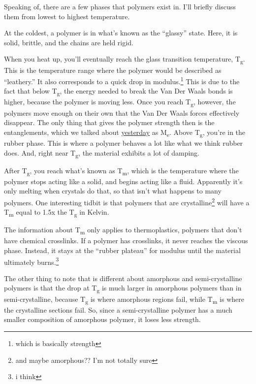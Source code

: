 \documentclass[12pt]{article}[titlepage]
\newcommand{\say}[1]{``#1''}
\newcommand{\1}{\={a}}
\newcommand{\2}{\={e}}
\newcommand{\3}{\={\i}}
\newcommand{\4}{\=o}
\newcommand{\5}{\=u}
\newcommand{\6}{\={A}}
\newcommand{\sub}[1]{\textsubscript{#1}}
\renewcommand{\,}{\textsuperscript{,}}
\begin{document}
Speaking of, there are a few phases that polymers exist in.
I'll briefly discuss them from lowest to highest temperature.

At the coldest, a polymer is in what's known as the \say{glassy} state.
Here, it is solid, brittle, and the chains are held rigid.

When you heat up, you'll eventually reach the glass transition temperature, T\sub{g}.
This is the temperature range where the polymer would be described as \say{leathery.}
It also corresponds to a quick drop in modulus.\footnote{which is basically strength}
This is due to the fact that below T\sub{g}, the energy needed to break the Van Der Waals bonds is higher, because the polymer is moving less.
Once you reach T\sub{g}, however, the polymers move enough on their own that the Van Der Waals forces effectively disappear.
The only thing that gives the polymer strength then is the entanglements, which we talked about \href{polymer-1.html}{yesterday} as M\sub{e}.
Above T\sub{g}, you're in the rubber phase.
This is where a polymer behaves a lot like what we think rubber does.
And, right near T\sub{g}, the material exhibits a lot of damping.

After T\sub{g}, you reach what's known as T\sub{m}, which is the temperature where the polymer stops acting like a solid, and begins acting like a fluid.
Apparently it's only melting when crystals do that, so that isn't what happens to many polymers.
One interesting tidbit is that polymers that are crystalline\footnote{and maybe amorphous?? I'm not totally sure} will have a T\sub{m} equal to 1.5x the T\sub{g} in Kelvin.

The information about T\sub{m} only applies to thermoplastics, polymers that don't have chemical crosslinks.
If a polymer has crosslinks, it never reaches the viscous phase.
Instead, it stays at the \say{rubber plateau} for modulus until the material ultimately burns.\footnote{i think}

The other thing to note that is different about amorphous and semi-crystalline polymers is that the drop at T\sub{g} is much larger in amorphous polymers than in semi-crystalline, because T\sub{g} is where amorphous regions fail, while T\sub{m} is where the crystalline sections fail.
So, since a semi-crystalline polymer has a much smaller composition of amorphous polymer, it loses less strength.
\end{document}
